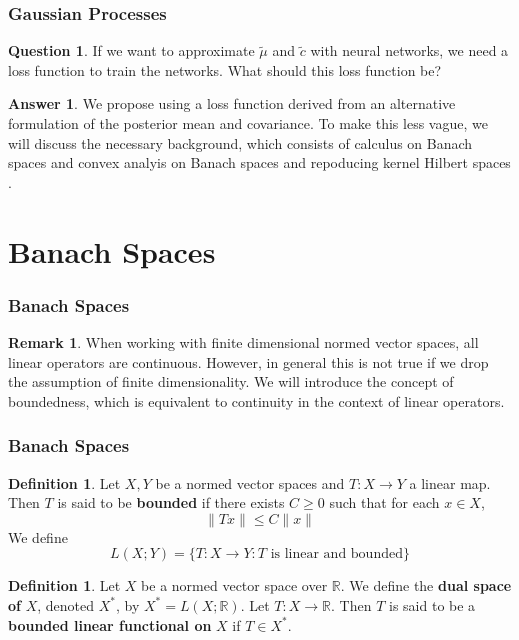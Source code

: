 \documentclass[notheorems]{beamer}
\theoremstyle{definition}
\newtheorem{defn}[definition]{Definition}
\newtheorem{ques}[definition]{Question}
\newtheorem{ans}[definition]{Answer}
\newtheorem{rem}[definition]{Remark}
\newcommand{\R}{\mathbb{R}}
\begin{document}
\begin{frame}
\frametitle{Gaussian Processes}

\begin{ques}
If we want to approximate $\tilde{\mu}$ and $\tilde{c}$ with neural networks, we need a loss function to train the networks. What should this loss function be? 
\end{ques}

\pause
\begin{ans}
We propose using a loss function derived from an alternative formulation of the posterior mean and covariance. To make this less vague, we will discuss the necessary background, which consists of calculus on Banach spaces and convex analyis on Banach spaces and repoducing kernel Hilbert spaces .
\end{ans}

\end{frame}







\section{Banach Spaces}


\begin{frame}
\frametitle{Banach Spaces}
	
	\begin{rem}
	When working with finite dimensional normed vector spaces, all linear operators are continuous. However, in general this is not true if we drop the assumption of finite dimensionality. We will introduce the concept of boundedness, which is equivalent to continuity in the context of linear operators.
	\end{rem}	
	
	\end{frame}
	
	
	
	
	
	
	
	
	
	
	
	
	
	
	
	
	\begin{frame}
	\frametitle{Banach Spaces}
	
	\begin{defn}
		Let $X,Y$ be a normed vector spaces and $T:X \rightarrow Y$ a linear map. Then $T$ is said to be \textbf{bounded} if there exists $C \geq 0$ such that for each $x \in X$, $$\|Tx \|\leq C \|x \|$$ We define $$L(X;Y) = \{T:X \rightarrow Y: T \text{ is linear and bounded}\}$$
	\end{defn}
	
	\pause
	\begin{defn}
	Let $X$ be a normed vector space over $\R$. We define the \textbf{dual space of} $X$, denoted $X^*$, by $X^* = L(X; \R)$. Let $T: X \rightarrow \R$. Then $T$ is said to be a \textbf{bounded linear functional on} $X$ if $T \in X^*$.
	\end{defn}
	\end{frame}
	
\end{document}
